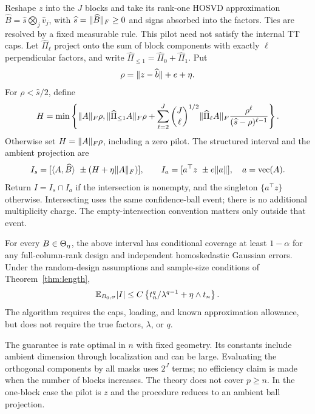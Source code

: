 Reshape $z$ into the $J$ blocks and take its rank-one HOSVD approximation $\widehat B=\widehat s\bigotimes_j\widehat v_j$, with $\widehat s=\lVert \widehat B\rVert_F\ge0$ and signs absorbed into the factors. Ties are resolved by a fixed measurable rule. This pilot need not satisfy the internal TT caps. Let $\widehat\Pi_\ell$ project onto the sum of block components with exactly $\ell$ perpendicular factors, and write $\widehat\Pi_{\le1}=\widehat\Pi_0+\widehat\Pi_1$. Put
\[
 \rho=\lVert z-\widehat b\rVert+e+\eta.
\]
For $\rho<\widehat s/2$, define
\begin{equation}\label{eq:graded}
 H=\min\left\{\lVert A\rVert_F\rho,
 \lVert \widehat\Pi_{\le1}A\rVert_F\rho+
 \sum_{\ell=2}^J \binom{J}{\ell}^{1/2}
 \lVert \widehat\Pi_\ell A\rVert_F
 \frac{\rho^\ell}{(\widehat s-\rho)^{\ell-1}}\right\}.
\end{equation}
Otherwise set $H=\lVert A\rVert_F\rho$, including a zero pilot. The structured interval and the ambient projection are
\[
 I_s=[\ip{A}{\widehat B}\ \pm(H+\eta\norm{A}_F)],\qquad
 I_a=[a^\top z\ \pm e\norm{a}],\quad a=\vecop(A).
\]
Return $I=I_s\cap I_a$ if the intersection is nonempty, and the singleton $\{a^\top z\}$ otherwise. Intersecting uses the same confidence-ball event; there is no additional multiplicity charge. The empty-intersection convention matters only outside that event.

\begin{theorem}\label{thm:procedure}
For every $B\in\Theta_\eta$, the above interval has conditional coverage at least $1-\alpha$ for any full-column-rank design and independent homoskedastic Gaussian errors. Under the random-design assumptions and sample-size conditions of Theorem~\ref{thm:length},
\[
 \mathbb E_{B_0,\sigma}|I|\le C\left\{t_n^q/\lambda^{q-1}+\eta\wedge t_n\right\}.
\]
The algorithm requires the caps, loading, and known approximation allowance, but does not require the true factors, $\lambda$, or $q$.
\end{theorem}

The guarantee is rate optimal in $n$ with fixed geometry. Its constants include ambient dimension through localization and can be large. Evaluating the orthogonal components by all masks uses $2^J$ terms; no efficiency claim is made when the number of blocks increases. The theory does not cover $p\ge n$. In the one-block case the pilot is $z$ and the procedure reduces to an ambient ball projection.

